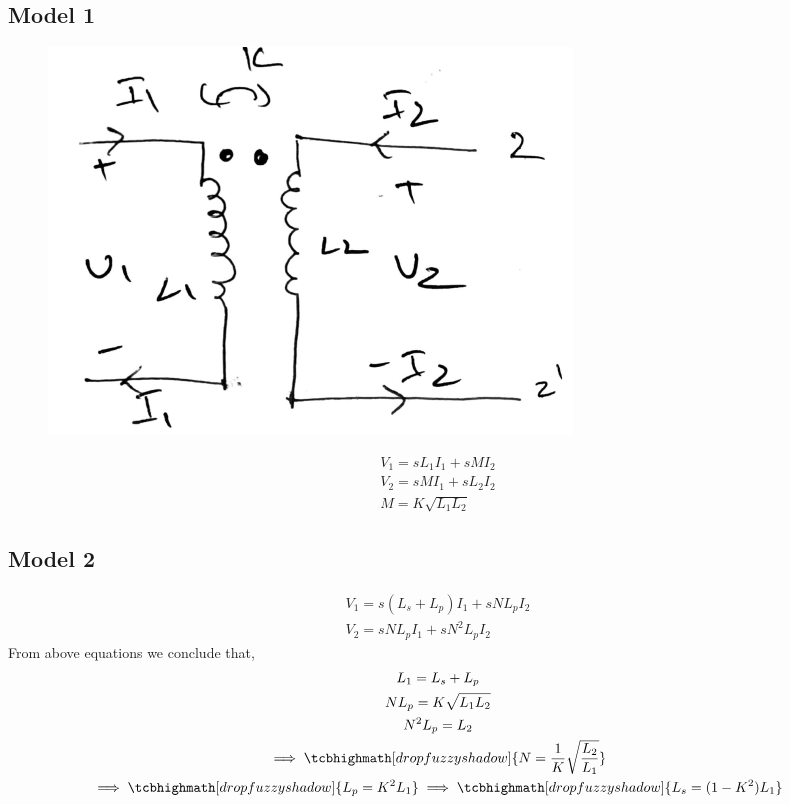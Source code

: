 \documentclass{article}
\begin{document}
\subsection*{Model 1}
\begin{figure}[H]
	\centering
	\includegraphics[scale=0.4]{./figs/5m1.png}
\end{figure}
\begin{gather*}
V_1 = sL_1I_1 + sMI_2\\
V_2 = sMI_1 + sL_2I_2\\
M = K\sqrt{L_1L_2}
\end{gather*}
\subsection*{Model 2}
\begin{figure}[H]
	\centering
\end{figure}
\begin{gather*}
V_1 = s(L_s + L_p)I_1 + sNL_pI_2\\
V_2 = sNL_pI_1 + sN^2L_pI_2
\end{gather*}
From above equations we conclude that,
\begin{gather*}
L_1 = L_s + L_p\\
NL_p = K\sqrt{L_1L_2}\\
N^2L_p = L_2\\
\implies \tcbhighmath[drop fuzzy shadow]{N =  \frac{1}{K}\sqrt{\frac{L_2}{L_1}}}\\
\implies \tcbhighmath[drop fuzzy shadow]{L_p = K^2L_1}
\implies \tcbhighmath[drop fuzzy shadow]{L_s = (1 - K^2)L_1}
\end{gather*}
\end{document}
